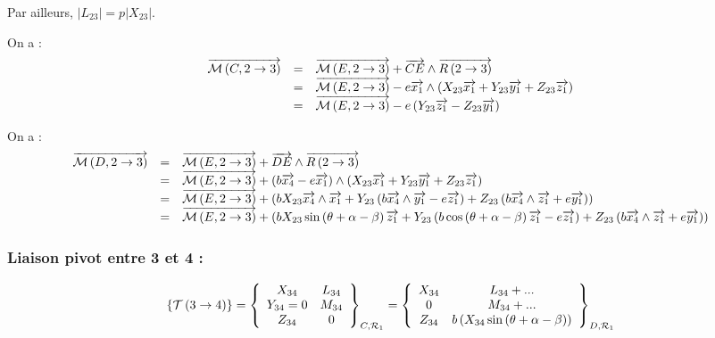 \documentclass[10pt,fleqn]{article} %
\begin{document}
Par ailleurs, $|L_{23}|=p|X_{23}|$.

On a :
$$
\begin{array}{lcl}
\vectm{C}{2}{3} &=& \vectm{E}{2}{3} + \vect{CE} \wedge \vectf{2}{3} \\
&=& \vectm{E}{2}{3} - e\vect{x_1} \wedge \left( X_{23} \vect{x_1} +Y_{23} \vect{y_1} +Z_{23} \vect{z_1}  \right) \\
&=& \vectm{E}{2}{3} - e \left( Y_{23} \vect{z_1} -Z_{23} \vect{y_1}  \right) \\
\end{array}
$$


On a :
$$
\begin{array}{lcl}
\vectm{D}{2}{3} &=& \vectm{E}{2}{3} + \vect{DE} \wedge \vectf{2}{3} \\
&=& \vectm{E}{2}{3} + \left( b\vect{x_4}- e\vect{x_1} \right)\wedge \left( X_{23} \vect{x_1} +Y_{23} \vect{y_1} +Z_{23} \vect{z_1}  \right) \\
&=& \vectm{E}{2}{3} +  \left( b X_{23}\vect{x_4}  \wedge  \vect{x_1} +Y_{23}\left( b\vect{x_4}\wedge  \vect{y_1} - e\vect{z_1} \right) +Z_{23}\left( b\vect{x_4}\wedge  \vect{z_1}+e\vect{y_1}\right)  \right) \\
&=& \vectm{E}{2}{3} +  \left( b X_{23}\sin \left(\theta + \alpha -\beta\right) \vect{z_1} +Y_{23}\left( b\cos \left(\theta + \alpha -\beta\right)\vect{z_1}- e\vect{z_1} \right) +Z_{23}\left( b\vect{x_4}\wedge  \vect{z_1}+e\vect{y_1}\right)  \right) \\
\end{array}
$$












\subsubsection*{Liaison pivot entre 3 et 4 :}
$$
\torseurstat{T}{3}{4}
=\torseurcol{X_{34}}{Y_{34}=0}{Z_{34}}{L_{34}}{M_{34}}{0}{C,\mathcal{R}_1}
=\torseurcol{X_{34}}{0}{Z_{34}}{L_{34}+...}{M_{34}+...}{ b \left( X_{34} \sin \left(\theta + \alpha -\beta\right)    \right)}{D,\mathcal{R}_1}
$$
\end{document}
